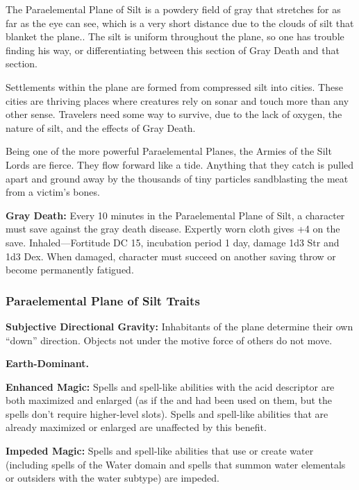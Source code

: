 The Paraelemental Plane of Silt is a powdery field of gray that stretches for as far as the eye can see, which is a very short distance due to the clouds of silt that blanket the plane.. The silt is uniform throughout the plane, so one has trouble finding his way, or differentiating between this section of Gray Death and that section.

Settlements within the plane are formed from compressed silt into cities. These cities are thriving places where creatures rely on sonar and touch more than any other sense. Travelers need some way to survive, due to the lack of oxygen, the nature of silt, and the effects of Gray Death.

Being one of the more powerful Paraelemental Planes, the Armies of the Silt Lords are fierce. They flow forward like a tide. Anything that they catch is pulled apart and ground away by the thousands of tiny particles sandblasting the meat from a victim's bones.

\textbf{Gray Death:} Every 10 minutes in the Paraelemental Plane of Silt, a character must save against the gray death disease. Expertly worn cloth gives +4 on the save. Inhaled---Fortitude DC 15, incubation period 1 day, damage 1d3 Str and 1d3 Dex. When damaged, character must succeed on another saving throw or become permanently fatigued.

\subsubsection{Paraelemental Plane of Silt Traits}
\begin{itemize*}
\item \textbf{Subjective Directional Gravity:} Inhabitants of the plane determine their own ``down'' direction. Objects not under the motive force of others do not move.
\item \textbf{Earth-Dominant.}
\item \textbf{Enhanced Magic:} Spells and spell-like abilities with the acid descriptor are both maximized and enlarged (as if the  and  had been used on them, but the spells don't require higher-level slots). Spells and spell-like abilities that are already maximized or enlarged are unaffected by this benefit.
\item \textbf{Impeded Magic:} Spells and spell-like abilities that use or create water (including spells of the Water domain and spells that summon water elementals or outsiders with the water subtype) are impeded.
\end{itemize*}
